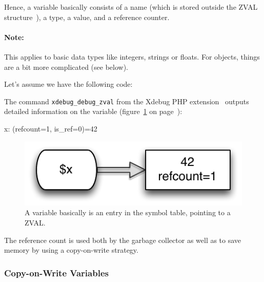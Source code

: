 Hence, a variable basically consists of a name (which is stored outside the ZVAL structure~\cite{php-extensions-zval}), a type, a value, and a reference counter.

\paragraph{Note:} This applies to basic data types like integers, strings or floats. For objects, things are a bit more complicated (see below).

Let's assume we have the following code:


The command \texttt{xdebug\_debug\_zval} from the Xdebug PHP extension~\cite{xdebug-functions} outputs detailed information on the variable (figure~\ref{fig:simple-variable} on page~\pageref{fig:simple-variable}):

\begin{textcode}
x: (refcount=1, is_ref=0)=42
\end{textcode}

\begin{figure}[!h]
  \begin{center}
    \includegraphics[scale=0.8]{images/x_42}
    \caption{A variable basically is an entry in the symbol table, pointing to a ZVAL.}
    \label{fig:simple-variable}
  \end{center}
\end{figure}

The reference count is used both by the garbage collector as well as to save memory by using a copy-on-write strategy.~\cite{php-manual-reference-counting}


\subsubsection{Copy-on-Write Variables}
\label{sec:copy-on-write}

